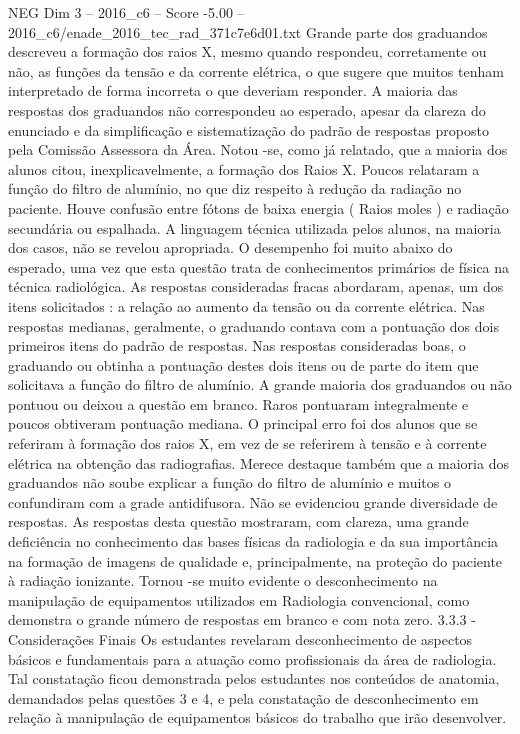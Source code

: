 \begin{textsample}{NEG Dim 3 – 2016\_c6 – Score -5.00 – 2016\_c6/enade\_2016\_tec\_rad\_371c7e6d01.txt}
Grande parte dos graduandos descreveu a formação dos raios X, mesmo quando respondeu, corretamente ou não, as funções da tensão e da corrente elétrica, o que sugere que muitos tenham interpretado de forma incorreta o que deveriam responder.
A maioria das respostas dos graduandos não correspondeu ao esperado, apesar da clareza do enunciado e da simplificação e sistematização do padrão de respostas proposto pela Comissão Assessora da Área.
Notou -se, como já relatado, que a maioria dos alunos citou, inexplicavelmente, a formação dos Raios X.
Poucos relataram a função do filtro de alumínio, no que diz respeito à redução da radiação no paciente.
Houve confusão entre fótons de baixa energia ( Raios moles ) e radiação secundária ou espalhada.
A linguagem técnica utilizada pelos alunos, na maioria dos casos, não se revelou apropriada.
O desempenho foi muito abaixo do esperado, uma vez que esta questão trata de conhecimentos primários de física na técnica radiológica.
As respostas consideradas fracas abordaram, apenas, um dos itens solicitados : a relação ao aumento da tensão ou da corrente elétrica.
Nas respostas medianas, geralmente, o graduando contava com a pontuação dos dois primeiros itens do padrão de respostas.
Nas respostas consideradas boas, o graduando ou obtinha a pontuação destes dois itens ou de parte do item que solicitava a função do filtro de alumínio.
A grande maioria dos graduandos ou não pontuou ou deixou a questão em branco.
Raros pontuaram integralmente e poucos obtiveram pontuação mediana.
O principal erro foi dos alunos que se referiram à formação dos raios X, em vez de se referirem à tensão e à corrente elétrica na obtenção das radiografias.
Merece destaque também que a maioria dos graduandos não soube explicar a função do filtro de alumínio e muitos o confundiram com a grade antidifusora.
Não se evidenciou grande diversidade de respostas.
As respostas desta questão mostraram, com clareza, uma grande deficiência no conhecimento das bases físicas da radiologia e da sua importância na formação de imagens de qualidade e, principalmente, na proteção do paciente à radiação ionizante.
Tornou -se muito evidente o desconhecimento na manipulação de equipamentos utilizados em Radiologia convencional, como demonstra o grande número de respostas em branco e com nota zero. 3.3.3 - Considerações Finais Os estudantes revelaram desconhecimento de aspectos básicos e fundamentais para a atuação como profissionais da área de radiologia.
Tal constatação ficou demonstrada pelos estudantes nos conteúdos de anatomia, demandados pelas questões 3 e 4, e pela constatação de desconhecimento em relação à manipulação de equipamentos básicos do trabalho que irão desenvolver.

\end{textsample}
